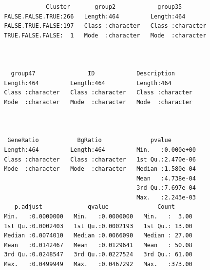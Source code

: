 \documentclass[]{article}
\newenvironment{Shaded}{\begin{snugshade}}{\end{snugshade}}
\newcommand{\KeywordTok}[1]{\textcolor[rgb]{0.13,0.29,0.53}{\textbf{#1}}}
\newcommand{\DataTypeTok}[1]{\textcolor[rgb]{0.13,0.29,0.53}{#1}}
\newcommand{\DecValTok}[1]{\textcolor[rgb]{0.00,0.00,0.81}{#1}}
\newcommand{\FloatTok}[1]{\textcolor[rgb]{0.00,0.00,0.81}{#1}}
\newcommand{\StringTok}[1]{\textcolor[rgb]{0.31,0.60,0.02}{#1}}
\newcommand{\CommentTok}[1]{\textcolor[rgb]{0.56,0.35,0.01}{\textit{#1}}}
\newcommand{\OperatorTok}[1]{\textcolor[rgb]{0.81,0.36,0.00}{\textbf{#1}}}
\newcommand{\NormalTok}[1]{#1}
\begin{document}
\begin{verbatim}
             Cluster       group2            group35         
 FALSE.FALSE.TRUE:266   Length:464         Length:464        
 FALSE.TRUE.FALSE:197   Class :character   Class :character  
 TRUE.FALSE.FALSE:  1   Mode  :character   Mode  :character  
                                                             
                                                             
                                                             
   group47               ID            Description       
 Length:464         Length:464         Length:464        
 Class :character   Class :character   Class :character  
 Mode  :character   Mode  :character   Mode  :character  
                                                         
                                                         
                                                         
  GeneRatio           BgRatio              pvalue         
 Length:464         Length:464         Min.   :0.000e+00  
 Class :character   Class :character   1st Qu.:2.470e-06  
 Mode  :character   Mode  :character   Median :1.580e-04  
                                       Mean   :4.738e-04  
                                       3rd Qu.:7.697e-04  
                                       Max.   :2.243e-03  
    p.adjust             qvalue              Count       
 Min.   :0.0000000   Min.   :0.0000000   Min.   :  3.00  
 1st Qu.:0.0002403   1st Qu.:0.0002193   1st Qu.: 13.00  
 Median :0.0074010   Median :0.0066090   Median : 27.00  
 Mean   :0.0142467   Mean   :0.0129641   Mean   : 50.08  
 3rd Qu.:0.0248547   3rd Qu.:0.0227524   3rd Qu.: 61.00  
 Max.   :0.0499949   Max.   :0.0467292   Max.   :373.00  
\end{verbatim}

\begin{Shaded}
\end{Shaded}
\end{document}
